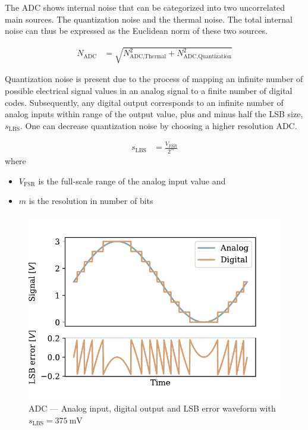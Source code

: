 The \ac{ADC} shows internal noise that can be categorized into two uncorrelated main sources. The quantization noise and the thermal noise. The total internal noise can thus be expressed as the Euclidean norm of these two sources.

\begin{align}
  N_\text{ADC} &= \sqrt{N_{\text{ADC},\text{Thermal}}^2 + N_{\text{ADC},\text{Quantization}}^2}
\end{align}

Quantization noise is present due to the process of mapping an infinite number of possible electrical signal values in an analog signal to a finite number of digital codes. Subsequently, any digital output corresponds to an infinite number of analog inputs within range of the output value, plus and minus half the \ac{LSB} size, $s_\text{LBS}$. One can decrease quantization noise by choosing a higher resolution \ac{ADC}.

\begin{align}
  s_\text{LBS} &= \frac{V_{FSR}}{2^m}
\end{align}
where
\begin{itemize}
  \item $V_{\text{FSR}}$ is the full-scale range of the analog input value and
  \item $m$ is the resolution in number of bits
\end{itemize}

\begin{figure}[!htb]
  \centering
  \includegraphics[scale=0.72]{figures/electronics/adc/plot_lsberr}
  \caption[ADC LSB waveform]{\ac{ADC} --- Analog input, digital output and \ac{LSB} error waveform with $s_\text{LBS} = \SI{375}{\milli\volt}$\cite{hall2020fund}%
    \label{fig:plot_lsberr}}
\end{figure}

